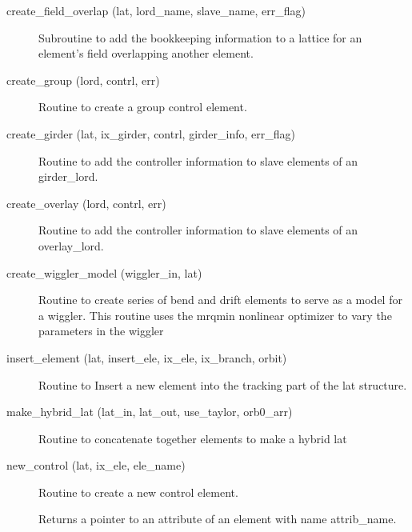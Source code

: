 \begin{description}
\label{r:create.field.overlap}
\item[create_field_overlap (lat, lord_name, slave_name, err_flag)] \Newline 
Subroutine to add the bookkeeping information to a lattice for an element's field
overlapping another element.

\label{r:create.group}
\item[create_group (lord, contrl, err)] \Newline
Routine to create a group control element. 

\label{r:create.girder}
\item[create_girder (lat, ix_girder, contrl, girder_info, err_flag)] \Newline 
     Routine to add the controller information to slave elements of
     an girder_lord.

\label{r:create.overlay}
\item[create_overlay (lord, contrl, err)] \Newline
Routine to add the controller information to slave elements of an 
overlay_lord. 

\label{r:create.wiggler.model}
\item[create_wiggler_model (wiggler_in, lat)] \Newline 
Routine to create series of bend and drift elements to serve as a model for a wiggler.
This routine uses the mrqmin nonlinear optimizer to vary the parameters in the wiggler 

\label{r:insert.element}
\item[insert_element (lat, insert_ele, ix_ele, ix_branch, orbit)] \Newline
Routine to Insert a new element into the tracking part of the 
lat structure. 

\label{r:make.hybrid.lat}
\item[make_hybrid_lat (lat_in, lat_out, use_taylor, orb0_arr)] \Newline
Routine to concatenate together elements to make a hybrid lat 

\label{r:new.control}
\item[new_control (lat, ix_ele, ele_name)] \Newline
Routine to create a new control element. 

\label{r:pointer.to.attribute}
\item[\protect\parbox{6in}{
  pointer_to_attribute (ele, attrib_name, do_allocation, \\
  \hspace*{1in} a_ptr, err_flag, err_print_flag, ix_attrib)}] \Newline
Returns a pointer to an attribute of an element with name attrib_name. 


\end{description}

